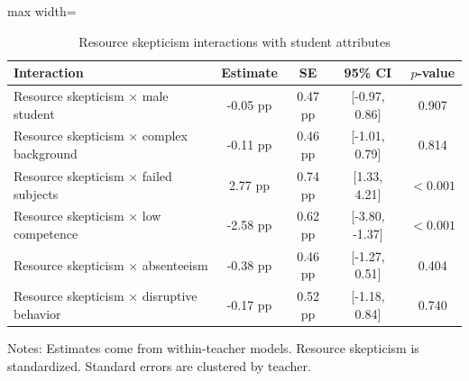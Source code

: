 \documentclass[12pt,a4paper]{article}
\newcommand{\ci}[2]{[#1, #2]}
\begin{document}
\begin{table}[!htbp]
\centering
\caption{Resource skepticism interactions with student attributes}
\label{tab:resource_interactions}
\begin{threeparttable}
\begin{adjustbox}{max width=\textwidth}
\begin{tabular}{lcccc}
\toprule
Interaction & Estimate & SE & 95\% CI & \(p\)-value \\
\midrule
Resource skepticism \(\times\) male student & -0.05 pp & 0.47 pp & \ci{-0.97}{0.86} & 0.907 \\
Resource skepticism \(\times\) complex background & -0.11 pp & 0.46 pp & \ci{-1.01}{0.79} & 0.814 \\
Resource skepticism \(\times\) failed subjects & 2.77 pp & 0.74 pp & \ci{1.33}{4.21} & \(<0.001\) \\
Resource skepticism \(\times\) low competence & -2.58 pp & 0.62 pp & \ci{-3.80}{-1.37} & \(<0.001\) \\
Resource skepticism \(\times\) absenteeism & -0.38 pp & 0.46 pp & \ci{-1.27}{0.51} & 0.404 \\
Resource skepticism \(\times\) disruptive behavior & -0.17 pp & 0.52 pp & \ci{-1.18}{0.84} & 0.740 \\
\bottomrule
\end{tabular}
\end{adjustbox}
\begin{tablenotes}[flushleft]
\footnotesize
\item Notes: Estimates come from within-teacher models. Resource skepticism is standardized. Standard errors are clustered by teacher.
\end{tablenotes}
\end{threeparttable}
\end{table}
\end{document}

